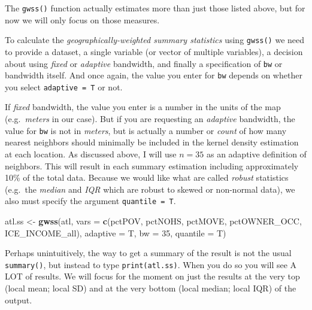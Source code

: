 \documentclass[
]{book}
\newenvironment{Shaded}{\begin{snugshade}}{\end{snugshade}}
\newcommand{\AttributeTok}[1]{\textcolor[rgb]{0.13,0.29,0.53}{#1}}
\newcommand{\DecValTok}[1]{\textcolor[rgb]{0.00,0.00,0.81}{#1}}
\newcommand{\FunctionTok}[1]{\textcolor[rgb]{0.13,0.29,0.53}{\textbf{#1}}}
\newcommand{\NormalTok}[1]{#1}
\newcommand{\OtherTok}[1]{\textcolor[rgb]{0.56,0.35,0.01}{#1}}
\newcommand{\StringTok}[1]{\textcolor[rgb]{0.31,0.60,0.02}{#1}}
\begin{document}
The \texttt{gwss()} function actually estimates more than just those listed above, but for now we will only focus on those measures.

To calculate the \emph{geographically-weighted summary statistics} using \texttt{gwss()} we need to provide a dataset, a single variable (or vector of multiple variables), a decision about using \emph{fixed} or \emph{adaptive} bandwidth, and finally a specification of \texttt{bw} or bandwidth itself. And once again, the value you enter for \texttt{bw} depends on whether you select \texttt{adaptive\ =\ T} or not.

If \emph{fixed} bandwidth, the value you enter is a number in the units of the map (e.g.~\emph{meters} in our case). But if you are requesting an \emph{adaptive} bandwidth, the value for \texttt{bw} is not in \emph{meters}, but is actually a number or \emph{count} of how many nearest neighbors should minimally be included in the kernel density estimation at each location. As discussed above, I will use \(n=35\) as an adaptive definition of neighbors. This will result in each summary estimation including approximately 10\% of the total data. Because we would like what are called \emph{robust} statistics (e.g.~the \emph{median} and \emph{IQR} which are robust to skewed or non-normal data), we also must specify the argument \texttt{quantile\ =\ T}.

\begin{Shaded}
\begin{Highlighting}[]
\NormalTok{atl.ss }\OtherTok{\textless{}{-}} \FunctionTok{gwss}\NormalTok{(atl, }\AttributeTok{vars =} \FunctionTok{c}\NormalTok{(}\StringTok{\textquotesingle{}pctPOV\textquotesingle{}}\NormalTok{, }\StringTok{\textquotesingle{}pctNOHS\textquotesingle{}}\NormalTok{, }\StringTok{\textquotesingle{}pctMOVE\textquotesingle{}}\NormalTok{, }\StringTok{\textquotesingle{}pctOWNER\_OCC\textquotesingle{}}\NormalTok{,}
                             \StringTok{\textquotesingle{}ICE\_INCOME\_all\textquotesingle{}}\NormalTok{),}
               \AttributeTok{adaptive =}\NormalTok{ T,}
               \AttributeTok{bw =} \DecValTok{35}\NormalTok{,}
               \AttributeTok{quantile =}\NormalTok{ T)}
\end{Highlighting}
\end{Shaded}

Perhaps unintuitively, the way to get a summary of the result is not the usual \texttt{summary()}, but instead to type \texttt{print(atl.ss)}. When you do so you will see A LOT of results. We will focus for the moment on just the results at the very top (local mean; local SD) and at the very bottom (local median; local IQR) of the output.
\end{document}
